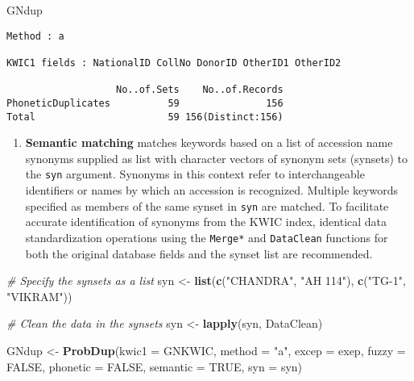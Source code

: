 \documentclass[
]{article}
\newenvironment{Shaded}{\begin{snugshade}}{\end{snugshade}}
\newcommand{\CommentTok}[1]{\textcolor[rgb]{0.56,0.35,0.01}{\textit{#1}}}
\newcommand{\DataTypeTok}[1]{\textcolor[rgb]{0.13,0.29,0.53}{#1}}
\newcommand{\KeywordTok}[1]{\textcolor[rgb]{0.13,0.29,0.53}{\textbf{#1}}}
\newcommand{\NormalTok}[1]{#1}
\newcommand{\OtherTok}[1]{\textcolor[rgb]{0.56,0.35,0.01}{#1}}
\newcommand{\StringTok}[1]{\textcolor[rgb]{0.31,0.60,0.02}{#1}}
\providecommand{\tightlist}{%
  \setlength{\itemsep}{0pt}\setlength{\parskip}{0pt}}
\begin{document}
\begin{Shaded}
\begin{Highlighting}[]
\NormalTok{GNdup}
\end{Highlighting}
\end{Shaded}

\begin{verbatim}
Method : a

KWIC1 fields : NationalID CollNo DonorID OtherID1 OtherID2
 
                   No..of.Sets    No..of.Records
PhoneticDuplicates          59               156
Total                       59 156(Distinct:156)
\end{verbatim}

\begin{enumerate}
\def\labelenumi{\arabic{enumi}.}
\setcounter{enumi}{2}
\tightlist
\item
  \textbf{Semantic matching} matches keywords based on a list of
  accession name synonyms supplied as list with character vectors of
  synonym sets (synsets) to the \texttt{syn} argument. Synonyms in this
  context refer to interchangeable identifiers or names by which an
  accession is recognized. Multiple keywords specified as members of the
  same synset in \texttt{syn} are matched. To facilitate accurate
  identification of synonyms from the KWIC index, identical data
  standardization operations using the \texttt{Merge*} and
  \texttt{DataClean} functions for both the original database fields and
  the synset list are recommended.
\end{enumerate}

\begin{Shaded}
\begin{Highlighting}[]
\CommentTok{# Specify the synsets as a list}
\NormalTok{syn <-}\StringTok{ }\KeywordTok{list}\NormalTok{(}\KeywordTok{c}\NormalTok{(}\StringTok{"CHANDRA"}\NormalTok{, }\StringTok{"AH 114"}\NormalTok{), }\KeywordTok{c}\NormalTok{(}\StringTok{"TG-1"}\NormalTok{, }\StringTok{"VIKRAM"}\NormalTok{))}

\CommentTok{# Clean the data in the synsets}
\NormalTok{syn <-}\StringTok{ }\KeywordTok{lapply}\NormalTok{(syn, DataClean)}

\NormalTok{GNdup <-}\StringTok{ }\KeywordTok{ProbDup}\NormalTok{(}\DataTypeTok{kwic1 =}\NormalTok{ GNKWIC, }\DataTypeTok{method =} \StringTok{"a"}\NormalTok{, }\DataTypeTok{excep =}\NormalTok{ exep, }
                 \DataTypeTok{fuzzy =} \OtherTok{FALSE}\NormalTok{, }\DataTypeTok{phonetic =} \OtherTok{FALSE}\NormalTok{,}
                 \DataTypeTok{semantic =} \OtherTok{TRUE}\NormalTok{, }\DataTypeTok{syn =}\NormalTok{ syn)}
\end{Highlighting}
\end{Shaded}
\end{document}
